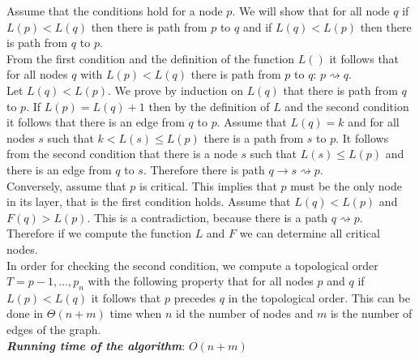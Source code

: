 \noindent Assume that the conditions hold for a node $p$. We will show that for all node $q$ if $L(p)<L(q)$ then there is path from $p$ to $q$ and if $L(q)<L(p)$ then  there is path from $q$ to $p$. \\
From the first condition and the definition of the function $L()$ it follows that for all nodes $q$ with $L(p)<L(q)$ there is path from $p$ to $q$: $p \rightsquigarrow q$. \\
Let $L(q)<L(p)$. We prove by induction on $L(q)$ that there is path from $q$ to $p$. If $L(p)=L(q)+1$ then by the definition of $L$ and the second condition it follows that there is an edge from $q$ to $p$. Assume that $L(q)=k$ and for all nodes $s$ such that $k<L(s) \leq L(p)$ there is a path from $s$ to $p$. It follows from the second condition that there is a node $s$ such that  $L(s) \leq L(p)$ and there is an edge from $q$ to $s$. Therefore there is path $q \rightarrow s \rightsquigarrow p$.\\

Conversely, assume that $p$ is critical. This implies that $p$ must be the only node in its layer, that is the first condition holds. Assume that $L(q)<L(p)$ and $F(q) > L(p)$. This is a contradiction, because there is a path $q \rightsquigarrow p$.\\

Therefore if we compute the function $L$ and $F$ we can determine all critical nodes.\\
In order for checking the second condition, we compute a topological order $T=p-1,\ldots, p_n$ with the following property that for all nodes $p$ and $q$ if $L(p)<L(q)$ it follows that $p$ precedes $q$ in the topological order. This can be done in $\Theta(n+m)$ time when $n$ id the number of nodes and $m$ is the number of edges of the graph.\\
\emph{\textbf{Running time of the algorithm}}: $O(n+m)$

